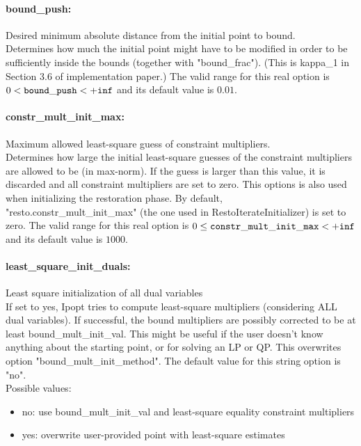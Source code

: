\paragraph{bound\_push:}\label{sec:bound_push} Desired minimum absolute distance from the initial point to bound. $\;$ \\
 Determines how much the initial point might have
to be modified in order to be sufficiently inside
the bounds (together with "bound\_frac").  (This
is kappa\_1 in Section 3.6 of implementation
paper.) The valid range for this real option is 
$0 <  {\tt bound\_push } <  {\tt +inf}$
and its default value is $0.01$.


\paragraph{constr\_mult\_init\_max:}\label{sec:constr_mult_init_max} Maximum allowed least-square guess of constraint multipliers. $\;$ \\
 Determines how large the initial least-square
guesses of the constraint multipliers are allowed
to be (in max-norm). If the guess is larger than
this value, it is discarded and all constraint
multipliers are set to zero.  This options is
also used when initializing the restoration
phase. By default,
"resto.constr\_mult\_init\_max" (the one used in
RestoIterateInitializer) is set to zero. The valid range for this real option is 
$0 \le {\tt constr\_mult\_init\_max } <  {\tt +inf}$
and its default value is $1000$.


\paragraph{least\_square\_init\_duals:}\label{sec:least_square_init_duals} Least square initialization of all dual variables $\;$ \\
 If set to yes, Ipopt tries to compute
least-square multipliers (considering ALL dual
variables).  If successful, the bound multipliers
are possibly corrected to be at least
bound\_mult\_init\_val. This might be useful if
the user doesn't know anything about the starting
point, or for solving an LP or QP.  This
overwrites option "bound\_mult\_init\_method".
The default value for this string option is "no".
\\ 
Possible values:
\begin{itemize}
   \item no: use bound\_mult\_init\_val and least-square
equality constraint multipliers
   \item yes: overwrite user-provided point with least-square
estimates
\end{itemize}


